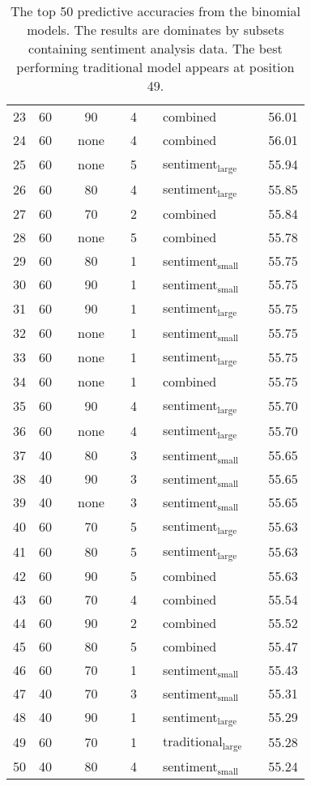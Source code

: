 \documentclass{article}
\begin{document}
\begin{table}
\begin{tabular}{cclclclllc}
23 & 60 &  & 90 &  & 4 &  & combined &  & 56.01\\
24 & 60 &  & none &  & 4 &  & combined &  & 56.01\\
25 & 60 &  & none &  & 5 &  & sentiment$_{\text{large}}$ &  & 55.94\\
26 & 60 &  & 80 &  & 4 &  & sentiment$_{\text{large}}$ &  & 55.85\\
27 & 60 &  & 70 &  & 2 &  & combined &  & 55.84\\
28 & 60 &  & none &  & 5 &  & combined &  & 55.78\\
29 & 60 &  & 80 &  & 1 &  & sentiment$_{\text{small}}$ &  & 55.75\\
30 & 60 &  & 90 &  & 1 &  & sentiment$_{\text{small}}$ &  & 55.75\\
31 & 60 &  & 90 &  & 1 &  & sentiment$_{\text{large}}$ &  & 55.75\\
32 & 60 &  & none &  & 1 &  & sentiment$_{\text{small}}$ &  & 55.75\\
33 & 60 &  & none &  & 1 &  & sentiment$_{\text{large}}$ &  & 55.75\\
34 & 60 &  & none &  & 1 &  & combined &  & 55.75\\
35 & 60 &  & 90 &  & 4 &  & sentiment$_{\text{large}}$ &  & 55.70\\
36 & 60 &  & none &  & 4 &  & sentiment$_{\text{large}}$ &  & 55.70\\
37 & 40 &  & 80 &  & 3 &  & sentiment$_{\text{small}}$ &  & 55.65\\
38 & 40 &  & 90 &  & 3 &  & sentiment$_{\text{small}}$ &  & 55.65\\
39 & 40 &  & none &  & 3 &  & sentiment$_{\text{small}}$ &  & 55.65\\
40 & 60 &  & 70 &  & 5 &  & sentiment$_{\text{large}}$ &  & 55.63\\
41 & 60 &  & 80 &  & 5 &  & sentiment$_{\text{large}}$ &  & 55.63\\
42 & 60 &  & 90 &  & 5 &  & combined &  & 55.63\\
43 & 60 &  & 70 &  & 4 &  & combined &  & 55.54\\
44 & 60 &  & 90 &  & 2 &  & combined &  & 55.52\\
45 & 60 &  & 80 &  & 5 &  & combined &  & 55.47\\
46 & 60 &  & 70 &  & 1 &  & sentiment$_{\text{small}}$ &  & 55.43\\
47 & 40 &  & 70 &  & 3 &  & sentiment$_{\text{small}}$ &  & 55.31\\
48 & 40 &  & 90 &  & 1 &  & sentiment$_{\text{large}}$ &  & 55.29\\
49 & 60 &  & 70 &  & 1 &  & traditional$_{\text{large}}$ &  & 55.28\\
50 & 40 &  & 80 &  & 4 &  & sentiment$_{\text{small}}$ &  & 55.24\\
\end{tabular}\caption[The top 50 binomial models, ranked by descending predictive accuracy]{\label{tab:top-bin-results}The top 50 predictive accuracies from the binomial models. The results are dominates by subsets containing sentiment analysis data. The best performing traditional model appears at position 49.}


\end{table}
\end{document}
